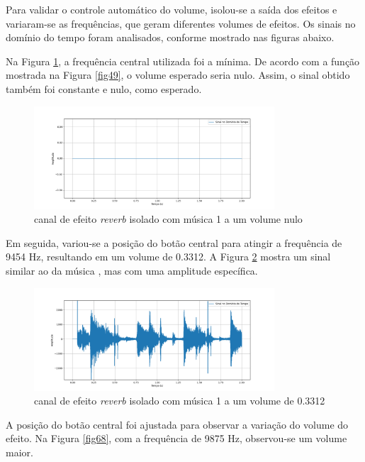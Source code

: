 Para validar o controle automático do volume, isolou-se a saída dos efeitos e variaram-se as frequências, que geram diferentes volumes de efeitos. Os sinais no domínio do tempo foram analisados, conforme mostrado nas figuras abaixo.

Na Figura \ref{fig66}, a frequência central utilizada foi a mínima. De acordo com a função mostrada na Figura \ref{fig49}, o volume esperado seria nulo. Assim, o sinal obtido também foi constante e nulo, como esperado.

\begin{figure}[h]
    \centering
    \includegraphics[width=0.8\textwidth]{figuras/fig66.png}
    \caption{canal de efeito \textit{reverb} isolado com música 1 a um volume nulo}
    \label{fig66}
\end{figure}

Em seguida, variou-se a posição do botão central para atingir a frequência de 9454 Hz, resultando em um volume de 0.3312. A Figura \ref{fig67} mostra um sinal similar ao da música \cite{track01}, mas com uma amplitude específica.

\begin{figure}[h]
    \centering
    \includegraphics[width=0.8\textwidth]{figuras/fig67.png}
    \caption{canal de efeito \textit{reverb} isolado com música 1 a um volume de 0.3312}
    \label{fig67}
\end{figure}

A posição do botão central foi ajustada para observar a variação do volume do efeito. Na Figura \ref{fig68}, com a frequência de 9875 Hz, observou-se um volume maior.


